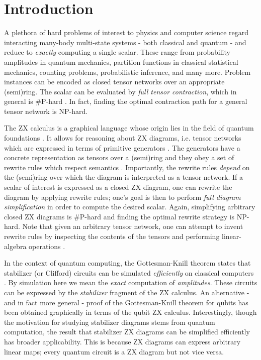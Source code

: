 \section{Introduction}


A plethora of hard problems of interest to physics and computer science
regard interacting many-body multi-state systems - both classical and quantum -
and reduce to \emph{exactly} computing a single scalar.
These range from probability amplitudes in quantum mechanics,
partition functions in classical statistical mechanics,
counting problems, probabilistic inference, and many more.
Problem instances can be encoded as closed
tensor networks over an appropriate (semi)ring.
The scalar can be evaluated by \emph{full tensor contraction},
which in general is \#P-hard \cite{Damm2002}.
In fact, finding the optimal contraction path for a general tensor network is NP-hard.

The ZX calculus is a graphical language whose origin lies in the field of quantum foundations \cite{Coecke2011}.
It allows for reasoning about ZX diagrams, i.e. tensor networks which are expressed in terms of primitive generators \cite{vandewetering2020zxcalculus}.
The generators have a concrete representation as tensors over
a (semi)ring and they obey a set of rewrite rules which respect semantics \cite{wang2020completeness}.
Importantly, the rewrite rules \emph{depend} on the (semi)ring over which the diagram is interpreted as a tensor network.
If a scalar of interest is expressed as a closed ZX diagram,
one can rewrite the diagram by applying rewrite rules; one's goal is then to perform \emph{full diagram simplification} in order to compute the desired scalar.
Again, simplifying arbitrary closed ZX diagrams is \#P-hard and finding the optimal rewrite strategy is NP-hard.
Note that
given an arbitrary tensor network, one can attempt to invent rewrite rules by inspecting the contents of the tensors and performing linear-algebra operations \cite{gray2020hyperoptimized}.

In the context of quantum computing,
the Gottesman-Knill theorem states that stabilizer (or Clifford) circuits can be
simulated \emph{efficiently} on classical computers \cite{Aaronson2004}.
By simulation here we mean the \emph{exact} computation of \emph{amplitudes}.
These circuits can be expressed by the \emph{stabilizer} fragment of the ZX calculus.
An alternative - and in fact more general - proof of the Gottesman-Knill theorem for qubits has been obtained graphically in terms of the qubit ZX calculus.
Interestingly, though the motivation for studying stabilizer diagrams stems from quantum computation, the result that stabilizer ZX diagrams can be simplified efficiently has broader applicability. This is because
ZX diagrams can express arbitrary linear maps;
every quantum circuit is a ZX diagram but not vice versa.

